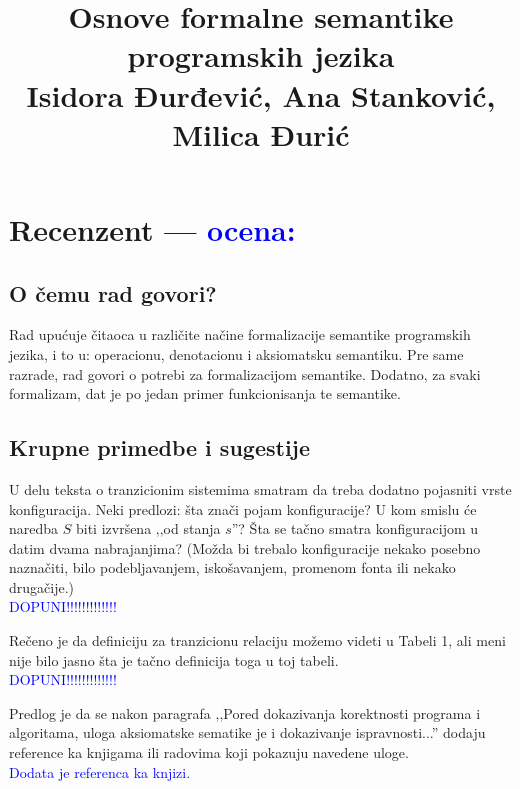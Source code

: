 \documentclass[a4paper]{report}
\newcommand{\odgovor}[1]{\textcolor{blue}{#1}}
\begin{document}
\title{Osnove formalne semantike programskih jezika\\ \small{Isidora Đurđević, Ana Stanković, Milica Đurić}}

\maketitle

\tableofcontents

\chapter{Recenzent \odgovor{--- ocena:}}

\section{O čemu rad govori?}

{Rad upućuje čitaoca u različite načine formalizacije semantike programskih jezika, i to u: operacionu, denotacionu i aksiomatsku semantiku. Pre same razrade, rad govori o potrebi za formalizacijom semantike. Dodatno, za svaki formalizam, dat je po jedan primer funkcionisanja te semantike.}

\section{Krupne primedbe i sugestije}

{U delu teksta o tranzicionim sistemima smatram da treba dodatno pojasniti vrste konfiguracija. Neki predlozi: šta znači pojam konfiguracije? U kom smislu će naredba $S$ biti izvršena ‚‚od stanja $s$''? Šta se tačno smatra konfiguracijom u datim dvama nabrajanjima? (Možda bi trebalo konfiguracije nekako posebno naznačiti, bilo podebljavanjem, iskošavanjem, promenom fonta ili nekako drugačije.)}\\
\odgovor{DOPUNI!!!!!!!!!!!!!}

{Rečeno je da definiciju za tranzicionu relaciju možemo videti u Tabeli 1, ali meni nije bilo jasno šta je tačno definicija toga u toj tabeli.}\\
\odgovor{DOPUNI!!!!!!!!!!!!!}

{Predlog je da se nakon paragrafa ‚‚Pored dokazivanja korektnosti programa i algoritama, uloga aksiomatske sematike je i dokazivanje ispravnosti...'' dodaju reference ka knjigama ili radovima koji pokazuju navedene uloge.}  \\
\odgovor {Dodata je referenca ka knjizi.}
	
\end{document}
